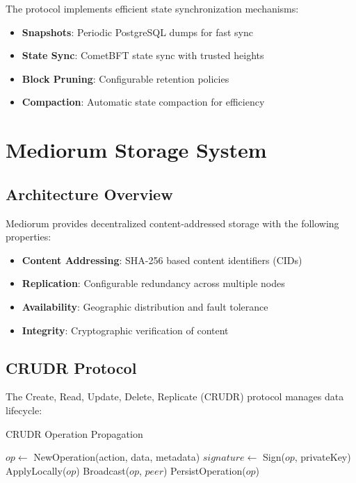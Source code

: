 \documentclass[11pt,a4paper]{article}
\begin{document}
The protocol implements efficient state synchronization mechanisms:

\begin{itemize}
  \item \textbf{Snapshots}: Periodic PostgreSQL dumps for fast sync
  \item \textbf{State Sync}: CometBFT state sync with trusted heights
  \item \textbf{Block Pruning}: Configurable retention policies
  \item \textbf{Compaction}: Automatic state compaction for efficiency
\end{itemize}

\section{Mediorum Storage System}

\subsection{Architecture Overview}

Mediorum provides decentralized content-addressed storage with the following properties:

\begin{itemize}
  \item \textbf{Content Addressing}: SHA-256 based content identifiers (CIDs)
  \item \textbf{Replication}: Configurable redundancy across multiple nodes
  \item \textbf{Availability}: Geographic distribution and fault tolerance
  \item \textbf{Integrity}: Cryptographic verification of content
\end{itemize}

\subsection{CRUDR Protocol}

The Create, Read, Update, Delete, Replicate (CRUDR) protocol manages data lifecycle:

\begin{algorithm}
  \caption{CRUDR Operation Propagation}
  \begin{algorithmic}[1]
    \STATE $op \leftarrow$ NewOperation(action, data, metadata)
    \STATE $signature \leftarrow$ Sign($op$, privateKey)
    \STATE ApplyLocally($op$)
    \STATE Broadcast($op$, $peer$)
    \ENDFOR
    \ENDIF
    \STATE PersistOperation($op$)
  \end{algorithmic}
\end{algorithm}
\end{document}
